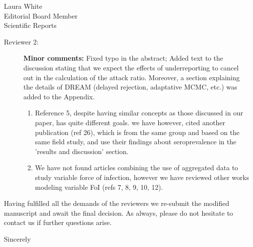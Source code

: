 \documentclass[a4paper,10pt]{letter}
\begin{document}
\begin{letter}{Laura White\\Editorial Board Member\\Scientific Reports }
\begin{description}
 \item [Reviewer 2:] \textbf{Minor comments:} Fixed typo in the abstract; Added 
text to the discussion stating that we expect the effects of underreporting to 
cancel out in the calculation of the attack ratio.
Moreover, a section explaining the details of DREAM (delayed rejection, 
adaptative MCMC, etc.) was added to the Appendix.
 \begin{enumerate}
  \item Reference 5, despite having similar concepts as those discussed in our 
paper, has quite different goals. we have however, cited another publication 
(ref 26), which is from the same group and based on the same field study, and 
use their findings about seroprevalence in the 'results and discussion' section.
\item We have not found articles combining the use of aggregated data to study 
variable force of infection, however we have reviewed other works modeling 
variable FoI (refs 7, 8, 9, 10, 12).
 \end{enumerate}

\end{description}

Having fulfilled all the demands of the reviewers we re-submit the modified 
manuscript and await the final decision. As always, please do not hesitate 
to contact us if further questions arise.


\signature{Flávio Codeço Coelho\\Professor}

\closing{Sincerely}


\end{letter}
\end{document}

